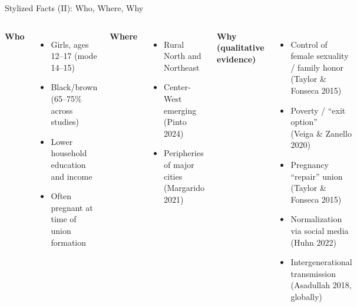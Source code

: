 \documentclass[aspectratio=169,10pt]{beamer}
\begin{document}
\begin{frame}{Stylized Facts (II): Who, Where, Why}
    \begin{columns}[T]
        \textbf{Who}
        \begin{itemize}
            \item Girls, ages 12--17 (mode 14--15)
            \item Black/brown (65--75\% across studies)
            \item Lower household education and income
            \item Often pregnant at time of union formation
        \end{itemize}

        \textbf{Where}
        \begin{itemize}
            \item Rural North and Northeast
            \item Center-West emerging (Pinto 2024)
            \item Peripheries of major cities (Margarido 2021)
        \end{itemize}

        \textbf{Why (qualitative evidence)}
        \begin{itemize}
            \item Control of female sexuality / family honor \\ (Taylor \& Fonseca 2015)
            \item Poverty / ``exit option'' \\ (Veiga \& Zanello 2020)
            \item Pregnancy ``repair'' union \\ (Taylor \& Fonseca 2015)
            \item Normalization via social media \\ (Huhn 2022)
            \item Intergenerational transmission \\ (Asadullah 2018, globally)
        \end{itemize}
    \end{columns}
\end{frame}
\end{document}
